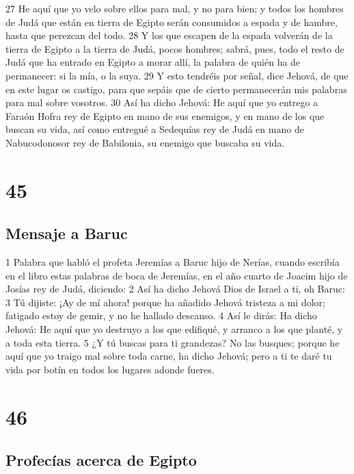 27 He aquí que yo velo sobre ellos para mal, y no para bien; y todos los hombres de Judá que están en tierra de Egipto serán consumidos a espada y de hambre, hasta que perezcan del todo.
28 Y los que escapen de la espada volverán de la tierra de Egipto a la tierra de Judá, pocos hombres; sabrá, pues, todo el resto de Judá que ha entrado en Egipto a morar allí, la palabra de quién ha de permanecer: si la mía, o la suya.
29 Y esto tendréis por señal, dice Jehová, de que en este lugar os castigo, para que sepáis que de cierto permanecerán mis palabras para mal sobre vosotros.
30 Así ha dicho Jehová: He aquí que yo entrego a Faraón Hofra rey de Egipto en mano de sus enemigos, y en mano de los que buscan su vida, así como entregué a Sedequías rey de Judá en mano de Nabucodonosor rey de Babilonia, su enemigo que buscaba su vida.

\chapter{45}

\section*{Mensaje a Baruc}

1 Palabra que habló el profeta Jeremías a Baruc hijo de Nerías, cuando escribía en el libro estas palabras de boca de Jeremías, en el año cuarto de Joacim hijo de Josías rey de Judá, diciendo:
2 Así ha dicho Jehová Dios de Israel a ti, oh Baruc:
3 Tú dijiste: ¡Ay de mí ahora! porque ha añadido Jehová tristeza a mi dolor; fatigado estoy de gemir, y no he hallado descanso.
4 Así le dirás: Ha dicho Jehová: He aquí que yo destruyo a los que edifiqué, y arranco a los que planté, y a toda esta tierra.
5 ¿Y tú buscas para ti grandezas? No las busques; porque he aquí que yo traigo mal sobre toda carne, ha dicho Jehová; pero a ti te daré tu vida por botín en todos los lugares adonde fueres.

\chapter{46}

\section*{Profecías acerca de Egipto }

